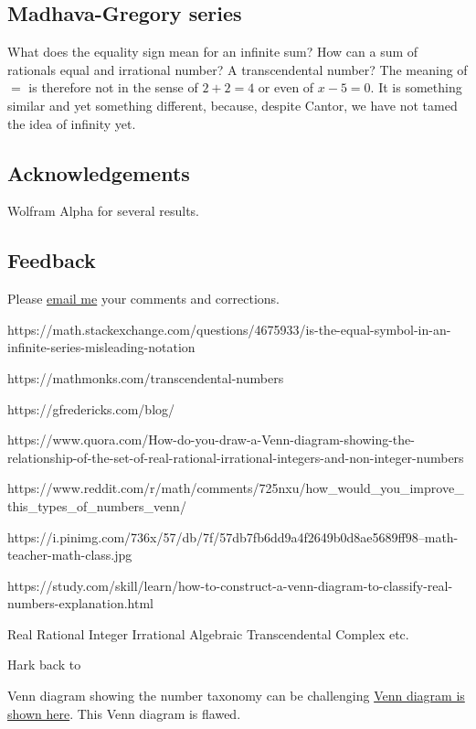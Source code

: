 \documentclass[
  a4paper,
]{article}
\begin{document}
\subsection{Madhava-Gregory series}\label{madhava-gregory-series}

What does the equality sign mean for an infinite sum? How can a sum of
rationals equal and irrational number? A transcendental number? The
meaning of \(=\) is therefore not in the sense of \(2 + 2 = 4\) or even
of \(x - 5 = 0\). It is something similar and yet something different,
because, despite Cantor, we have not tamed the idea of infinity yet.

\subsection{Acknowledgements}\label{acknowledgements}

Wolfram Alpha for several results.

\subsection{Feedback}\label{feedback}

Please \href{mailto:feedback.swanlotus@gmail.com}{email me} your
comments and corrections.

https://math.stackexchange.com/questions/4675933/is-the-equal-symbol-in-an-infinite-series-misleading-notation

https://mathmonks.com/transcendental-numbers

https://gfredericks.com/blog/

https://www.quora.com/How-do-you-draw-a-Venn-diagram-showing-the-relationship-of-the-set-of-real-rational-irrational-integers-and-non-integer-numbers

https://www.reddit.com/r/math/comments/725nxu/how\_would\_you\_improve\_this\_types\_of\_numbers\_venn/

https://i.pinimg.com/736x/57/db/7f/57db7fb6dd9a4f2649b0d8ae5689ff98--math-teacher-math-class.jpg

https://study.com/skill/learn/how-to-construct-a-venn-diagram-to-classify-real-numbers-explanation.html

Real Rational Integer Irrational Algebraic Transcendental Complex etc.

Hark back to

Venn diagram showing the number taxonomy can be challenging
\href{https://mathmonks.com/transcendental-numbers}{Venn diagram is
shown here}. This Venn diagram is flawed.
\end{document}
